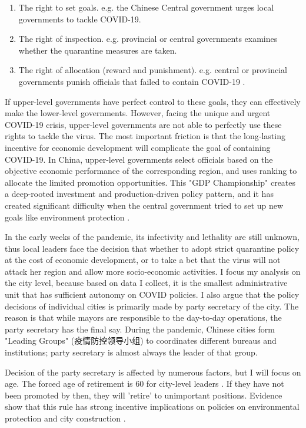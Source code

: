 \documentclass{article}
\begin{document}
\begin{CJK}{UTF8}{gbsn}
\begin{enumerate}
  \item The right to set goals. e.g. the Chinese Central government urges local governments to tackle COVID-19.
  \item The right of inspection. e.g. provincial or central governments examines whether the quarantine measures are taken. 
  \item The right of allocation (reward and punishment). e.g. central or provincial governments punish officials that failed to contain COVID-19 \cite{chezhi}.
\end{enumerate}

If upper-level governments have perfect control to these goals, they can effectively make the lower-level governments. 
However, facing the unique and urgent COVID-19 crisis, upper-level governments are not able to perfectly use these rights to tackle the virus. The most important friction is that the long-lasting incentive for economic development will complicate the goal of containing COVID-19. In China, upper-level governments select officials based on the objective economic performance of the corresponding region, and uses ranking to allocate the limited promotion opportunities. This "GDP Championship" creates a deep-rooted investment and production-driven policy pattern, and it has created significant difficulty when the central government tried to set up new goals like environment protection \cite{gdp contest}. 

In the early weeks of the pandemic, its infectivity and lethality are still unknown, thus local leaders face the decision that whether to adopt strict quarantine policy at the cost of economic development, or to take a bet that the virus will not attack her region and allow more socio-economic activities. I focus my analysis on the city level, because based on data I collect, it is the smallest administrative unit that has sufficient autonomy on COVID policies. I also argue that the policy decisions of individual cities is primarily made by party secretary of the city. The reason is that while mayors are responsible to the day-to-day operations, the party secretary has the final say. During the pandemic, Chinese cities form "Leading Groups" (疫情防控领导小组) to coordinates different bureaus and institutions; party secretary is almost always the leader of that group.

Decision of the party secretary is affected by numerous factors, but I will focus on age. The forced age of retirement is 60 for city-level leaders \cite{tuixiu}. If they have not been promoted by then, they will 'retire' to unimportant positions. Evidence show that this rule has strong incentive implications on policies on environmental protection and city construction \cite{mayor age effect, mayor age effect2}. 


\end{CJK}
\end{document}
